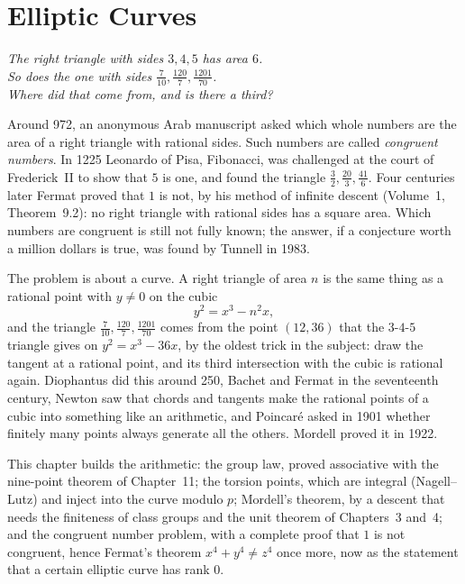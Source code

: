 \chapter{Elliptic Curves}
\begin{center}\itshape
The right triangle with sides $3,4,5$ has area $6$.\\
So does the one with sides $\frac7{10},\frac{120}7,\frac{1201}{70}$.\\
Where did that come from, and is there a third?
\end{center}

Around 972, an anonymous Arab manuscript asked which whole numbers are the area of a right triangle with rational sides. Such numbers
are called \emph{congruent numbers}. In 1225 Leonardo of Pisa, Fibonacci, was challenged at the court of Frederick~II to show that $5$ is
one, and found the triangle $\frac32,\frac{20}3,\frac{41}6$. Four centuries later Fermat proved that $1$ is not, by his method of infinite
descent (Volume~1, Theorem~9.2): no right triangle with rational sides has a square area. Which numbers are congruent is still not fully
known; the answer, if a conjecture worth a million dollars is true, was found by Tunnell in 1983.

The problem is about a curve. A right triangle of area $n$ is the same thing as a rational point with $y\neq0$ on the cubic
\[
y^2=x^3-n^2x,
\]
and the triangle $\frac7{10},\frac{120}7,\frac{1201}{70}$ comes from the point $(12,36)$ that the $3$-$4$-$5$ triangle gives on $y^2=x^3-36x$, by
the oldest trick in the subject: draw the tangent at a rational point, and its third intersection with the cubic is rational again. Diophantus did this
around 250, Bachet and Fermat in the seventeenth century, Newton saw that chords and tangents make the rational points of a cubic into
something like an arithmetic, and Poincar\'e asked in 1901 whether finitely many points always generate all the others. Mordell proved it in 1922.

This chapter builds the arithmetic: the group law, proved associative with the nine-point theorem of Chapter~11; the torsion points, which are
integral (Nagell--Lutz) and inject into the curve modulo $p$; Mordell's theorem, by a descent that needs the finiteness of class groups and the unit
theorem of Chapters~3 and~4; and the congruent number problem, with a complete proof that $1$ is not congruent, hence Fermat's theorem
$x^4+y^4\ne z^4$ once more, now as the statement that a certain elliptic curve has rank $0$.

